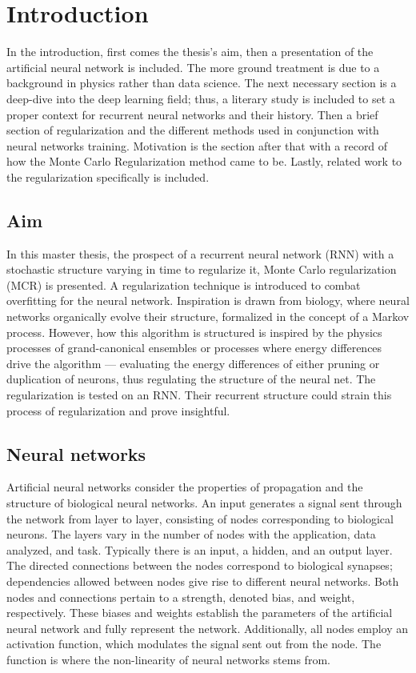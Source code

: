 
\chapter{Introduction}

In the introduction, first comes the thesis's aim, then a presentation of the artificial neural network is included. The more ground treatment is due to a background in physics rather than data science. The next necessary section is a deep-dive into the deep learning field; thus, a literary study is included to set a proper context for recurrent neural networks and their history. Then a brief section of regularization and the different methods used in conjunction with neural networks training. Motivation is the section after that with a record of how the Monte Carlo Regularization method came to be. Lastly, related work to the regularization specifically is included.

\section{Aim}

In this master thesis, the prospect of a recurrent neural network (RNN) with a stochastic structure varying in time to regularize it, Monte Carlo regularization (MCR) is presented. A regularization technique is introduced to combat overfitting for the neural network. Inspiration is drawn from biology, where neural networks organically evolve their structure, formalized in the concept of a Markov process. However, how this algorithm is structured is inspired by the physics processes of grand-canonical ensembles or processes where energy differences drive the algorithm — evaluating the energy differences of either pruning or duplication of neurons, thus regulating the structure of the neural net. The regularization is tested on an RNN. Their recurrent structure could strain this process of regularization and prove insightful. 

\section{Neural networks}

Artificial neural networks consider the properties of propagation and the structure of biological neural networks. An input generates a signal sent through the network from layer to layer, consisting of nodes corresponding to biological neurons. The layers vary in the number of nodes with the application, data analyzed, and task. Typically there is an input, a hidden, and an output layer. The directed connections between the nodes correspond to biological synapses; dependencies allowed between nodes give rise to different neural networks. Both nodes and connections pertain to a strength, denoted bias, and weight, respectively. These biases and weights establish the parameters of the artificial neural network and fully represent the network. Additionally, all nodes employ an activation function, which modulates the signal sent out from the node. The function is where the non-linearity of neural networks stems from.

